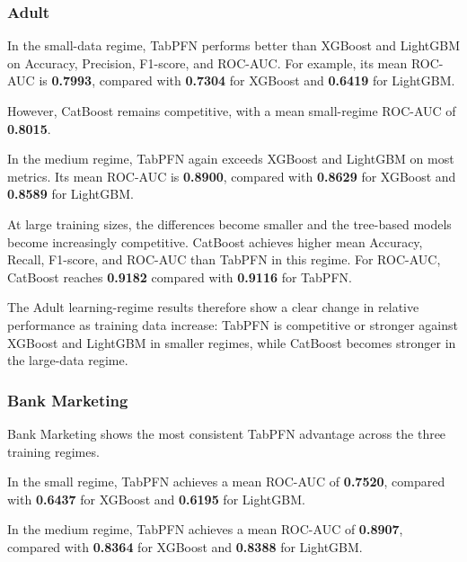 \subsubsection{Adult}



In the small-data regime, TabPFN performs better than XGBoost and LightGBM on Accuracy, Precision, F1-score, and ROC-AUC. For example, its mean ROC-AUC is \textbf{0.7993}, compared with \textbf{0.7304} for XGBoost and \textbf{0.6419} for LightGBM.



However, CatBoost remains competitive, with a mean small-regime ROC-AUC of \textbf{0.8015}.



In the medium regime, TabPFN again exceeds XGBoost and LightGBM on most metrics. Its mean ROC-AUC is \textbf{0.8900}, compared with \textbf{0.8629} for XGBoost and \textbf{0.8589} for LightGBM.



At large training sizes, the differences become smaller and the tree-based models become increasingly competitive. CatBoost achieves higher mean Accuracy, Recall, F1-score, and ROC-AUC than TabPFN in this regime. For ROC-AUC, CatBoost reaches \textbf{0.9182} compared with \textbf{0.9116} for TabPFN.



The Adult learning-regime results therefore show a clear change in relative performance as training data increase: TabPFN is competitive or stronger against XGBoost and LightGBM in smaller regimes, while CatBoost becomes stronger in the large-data regime.



\subsubsection{Bank Marketing}



Bank Marketing shows the most consistent TabPFN advantage across the three training regimes.



In the small regime, TabPFN achieves a mean ROC-AUC of \textbf{0.7520}, compared with \textbf{0.6437} for XGBoost and \textbf{0.6195} for LightGBM.



In the medium regime, TabPFN achieves a mean ROC-AUC of \textbf{0.8907}, compared with \textbf{0.8364} for XGBoost and \textbf{0.8388} for LightGBM.



